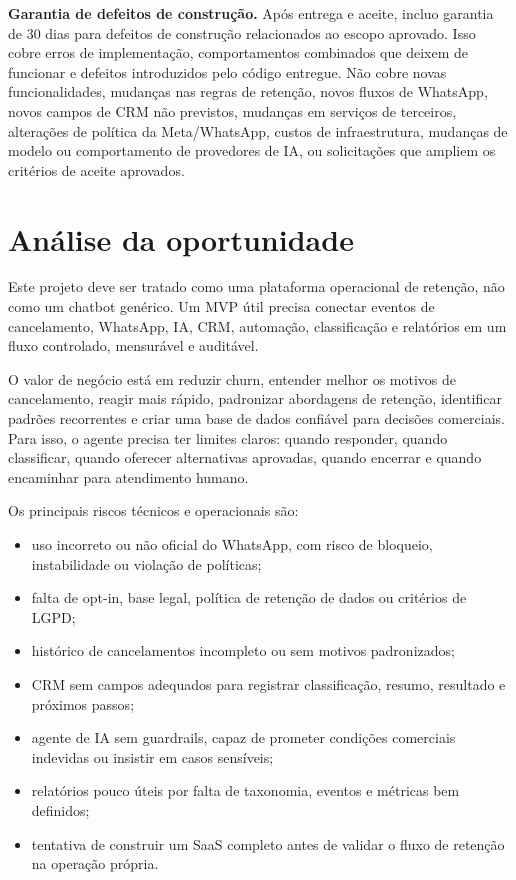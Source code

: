 \documentclass[11pt,a4paper]{article}
\begin{document}
\textbf{Garantia de defeitos de construção.} Após entrega e aceite, incluo garantia de 30 dias para defeitos de construção relacionados ao escopo aprovado. Isso cobre erros de implementação, comportamentos combinados que deixem de funcionar e defeitos introduzidos pelo código entregue. Não cobre novas funcionalidades, mudanças nas regras de retenção, novos fluxos de WhatsApp, novos campos de CRM não previstos, mudanças em serviços de terceiros, alterações de política da Meta/WhatsApp, custos de infraestrutura, mudanças de modelo ou comportamento de provedores de IA, ou solicitações que ampliem os critérios de aceite aprovados.\par

\section*{Análise da oportunidade}

Este projeto deve ser tratado como uma plataforma operacional de retenção, não como um chatbot genérico. Um MVP útil precisa conectar eventos de cancelamento, WhatsApp, IA, CRM, automação, classificação e relatórios em um fluxo controlado, mensurável e auditável.\par

O valor de negócio está em reduzir churn, entender melhor os motivos de cancelamento, reagir mais rápido, padronizar abordagens de retenção, identificar padrões recorrentes e criar uma base de dados confiável para decisões comerciais. Para isso, o agente precisa ter limites claros: quando responder, quando classificar, quando oferecer alternativas aprovadas, quando encerrar e quando encaminhar para atendimento humano.\par

Os principais riscos técnicos e operacionais são:\par

\begin{itemize}
\item uso incorreto ou não oficial do WhatsApp, com risco de bloqueio, instabilidade ou violação de políticas;
\item falta de opt-in, base legal, política de retenção de dados ou critérios de LGPD;
\item histórico de cancelamentos incompleto ou sem motivos padronizados;
\item CRM sem campos adequados para registrar classificação, resumo, resultado e próximos passos;
\item agente de IA sem guardrails, capaz de prometer condições comerciais indevidas ou insistir em casos sensíveis;
\item relatórios pouco úteis por falta de taxonomia, eventos e métricas bem definidos;
\item tentativa de construir um SaaS completo antes de validar o fluxo de retenção na operação própria.
\end{itemize}
\end{document}
